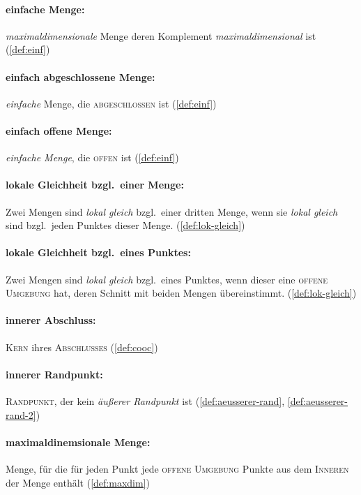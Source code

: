     \paragraph{einfache Menge:} \textit{maximaldimensionale} Menge deren Komplement \textit{maximaldimensional} ist (\ref{def:einf})
    
    \paragraph{einfach abgeschlossene Menge:} \textit{einfache} Menge, die \textsc{abgeschlossen} ist (\ref{def:einf})
    
    \paragraph{einfach offene Menge:} \textit{einfache Menge}, die \textsc{offen} ist (\ref{def:einf})
    
    \paragraph{lokale Gleichheit bzgl.\ einer Menge:} Zwei Mengen sind \textit{lokal gleich} bzgl.\ einer dritten Menge, wenn sie \textit{lokal gleich} sind bzgl.\ jeden Punktes dieser Menge. (\ref{def:lok-gleich})

    \paragraph{lokale Gleichheit bzgl.\ eines Punktes:} Zwei Mengen sind \textit{lokal gleich} bzgl.\ eines Punktes, wenn dieser eine \textsc{offene Umgebung} hat, deren Schnitt mit beiden Mengen übereinstimmt. (\ref{def:lok-gleich})
    
    \paragraph{innerer Abschluss:} \textsc{Kern} ihres \textsc{Abschlusses} (\ref{def:cooc})
    
    \paragraph{innerer Randpunkt:} \textsc{Randpunkt}, der kein \textit{äußerer Randpunkt} ist (\ref{def:aeusserer-rand}, \ref{def:aeusserer-rand-2})
    
    \paragraph{maximaldinemsionale Menge:} Menge, für die für jeden Punkt jede \textsc{offene Umgebung} Punkte aus dem \textsc{Inneren} der Menge enthält  (\ref{def:maxdim})
    

